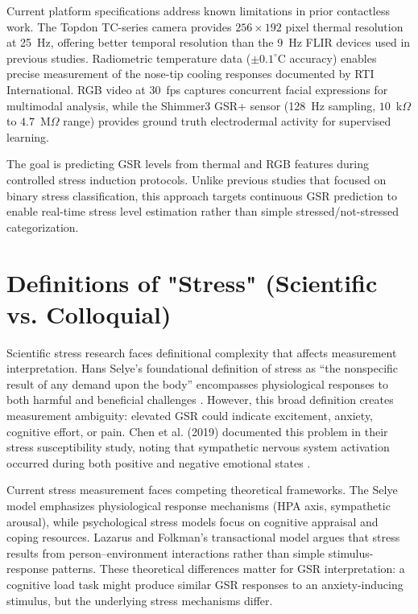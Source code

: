 \documentclass{report}
\begin{document}
    Current platform specifications address known limitations in prior contactless work. The Topdon TC-series camera provides $256 \times 192$ pixel thermal resolution at 25~Hz, offering better temporal resolution than the 9~Hz FLIR devices used in previous studies. Radiometric temperature data ($\pm 0.1^{\circ}$C accuracy) enables precise measurement of the nose-tip cooling responses documented by RTI International. RGB video at 30~fps captures concurrent facial expressions for multimodal analysis, while the Shimmer3 GSR+ sensor (128~Hz sampling, $10$~k$\Omega$ to $4.7$~M$\Omega$ range) provides ground truth electrodermal activity for supervised learning.

    The goal is predicting GSR levels from thermal and RGB features during controlled stress induction protocols. Unlike previous studies that focused on binary stress classification, this approach targets continuous GSR prediction to enable real-time stress level estimation rather than simple stressed/not-stressed categorization.


    \section{Definitions of "Stress" (Scientific vs. Colloquial)}
    \label{sec:stress_definitions}

    Scientific stress research faces definitional complexity that affects measurement interpretation. Hans Selye's foundational definition of stress as ``the nonspecific result of any demand upon the body'' encompasses physiological responses to both harmful and beneficial challenges \cite{selye11}. However, this broad definition creates measurement ambiguity: elevated GSR could indicate excitement, anxiety, cognitive effort, or pain. Chen et al. (2019) documented this problem in their stress susceptibility study, noting that sympathetic nervous system activation occurred during both positive and negative emotional states \cite{chen2019}.

    Current stress measurement faces competing theoretical frameworks. The Selye model emphasizes physiological response mechanisms (HPA axis, sympathetic arousal), while psychological stress models focus on cognitive appraisal and coping resources. Lazarus and Folkman's transactional model argues that stress results from person--environment interactions rather than simple stimulus-response patterns. These theoretical differences matter for GSR interpretation: a cognitive load task might produce similar GSR responses to an anxiety-inducing stimulus, but the underlying stress mechanisms differ.
\end{document}
